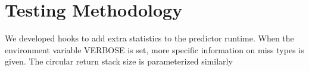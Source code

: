 \section{Testing Methodology}
We developed hooks to add extra statistics to the predictor runtime. When the environment variable VERBOSE is set, more specific information on miss types is given. The circular return stack size is parameterized similarly

